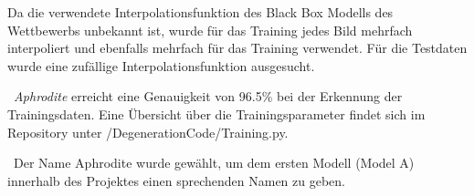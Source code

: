Da die verwendete Interpolationsfunktion des Black Box Modells des Wettbewerbs unbekannt ist, wurde für das Training jedes Bild mehrfach interpoliert und ebenfalls mehrfach für das Training verwendet. Für die Testdaten wurde eine zufällige Interpolationsfunktion ausgesucht. 

~\newline \textit{Aphrodite} erreicht eine Genauigkeit von 96.5\% bei der Erkennung der Trainingsdaten. Eine Übersicht über die Trainingsparameter findet sich im Repository unter /DegenerationCode/Training.py. 

~\newline Der Name Aphrodite wurde gewählt, um dem ersten Modell (Model A) innerhalb des Projektes einen sprechenden Namen zu geben.
